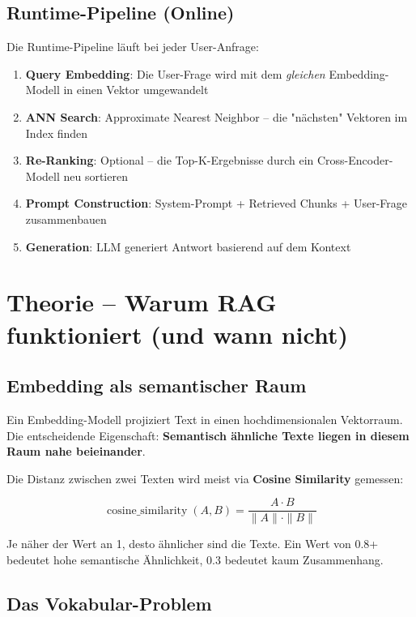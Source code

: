 \subsection{Runtime-Pipeline (Online)}

Die Runtime-Pipeline läuft bei jeder User-Anfrage:

\begin{enumerate}[leftmargin=*]
    \item \textbf{Query Embedding}: Die User-Frage wird mit dem \textit{gleichen} Embedding-Modell in einen Vektor umgewandelt
    \item \textbf{ANN Search}: Approximate Nearest Neighbor -- die "nächsten" Vektoren im Index finden
    \item \textbf{Re-Ranking}: Optional -- die Top-K-Ergebnisse durch ein Cross-Encoder-Modell neu sortieren
    \item \textbf{Prompt Construction}: System-Prompt + Retrieved Chunks + User-Frage zusammenbauen
    \item \textbf{Generation}: LLM generiert Antwort basierend auf dem Kontext
\end{enumerate}

\section{Theorie -- Warum RAG funktioniert (und wann nicht)}

\subsection{Embedding als semantischer Raum}

Ein Embedding-Modell projiziert Text in einen hochdimensionalen Vektorraum. Die entscheidende Eigenschaft: \textbf{Semantisch ähnliche Texte liegen in diesem Raum nahe beieinander}.

Die Distanz zwischen zwei Texten wird meist via \textbf{Cosine Similarity} gemessen:

\[
\operatorname{cosine\_similarity}(A, B) = \frac{A \cdot B}{\|A\| \cdot \|B\|}
\]

Je näher der Wert an 1, desto ähnlicher sind die Texte. Ein Wert von 0.8+ bedeutet hohe semantische Ähnlichkeit, 0.3 bedeutet kaum Zusammenhang.

\subsection{Das Vokabular-Problem}

